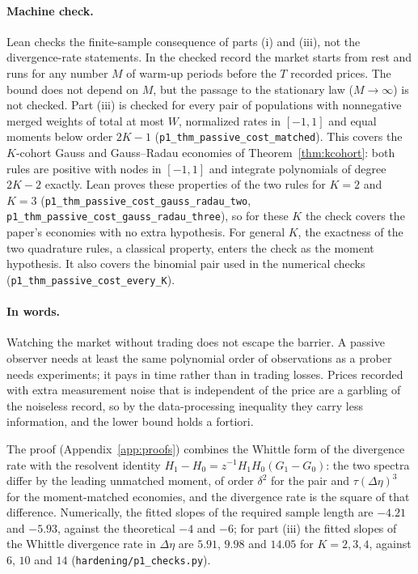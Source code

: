 \paragraph{Machine check.} Lean checks the finite-sample consequence of parts (i) and (iii), not the divergence-rate statements. In the checked record the market starts from rest and runs for any number $M$ of warm-up periods before the $T$ recorded prices. The bound does not depend on $M$, but the passage to the stationary law ($M\to\infty$) is not checked. Part (iii) is checked for every pair of populations with nonnegative merged weights of total at most $W$, normalized rates in $[-1,1]$ and equal moments below order $2K-1$ (\texttt{p1\_thm\_passive\_cost\_matched}). This covers the $K$-cohort Gauss and Gauss--Radau economies of Theorem~\ref{thm:kcohort}: both rules are positive with nodes in $[-1,1]$ and integrate polynomials of degree $2K-2$ exactly. Lean proves these properties of the two rules for $K=2$ and $K=3$ (\texttt{p1\_thm\_passive\_cost\_gauss\_radau\_two}, \texttt{p1\_thm\_passive\_cost\_gauss\_radau\_three}), so for these $K$ the check covers the paper's economies with no extra hypothesis. For general $K$, the exactness of the two quadrature rules, a classical property, enters the check as the moment hypothesis. It also covers the binomial pair used in the numerical checks (\texttt{p1\_thm\_passive\_cost\_every\_K}).

\paragraph{In words.} Watching the market without trading does not escape the barrier. A passive observer needs at least the same polynomial order of observations as a prober needs experiments; it pays in time rather than in trading losses. Prices recorded with extra measurement noise that is independent of the price are a garbling of the noiseless record, so by the data-processing inequality they carry less information, and the lower bound holds a fortiori.


The proof (Appendix~\ref{app:proofs}) combines the Whittle form of the divergence rate with the resolvent identity $H_1-H_0=z^{-1}H_1H_0(G_1-G_0)$: the two spectra differ by the leading unmatched moment, of order $\delta^2$ for the pair and $\tau(\Delta\eta)^3$ for the moment-matched economies, and the divergence rate is the square of that difference. Numerically, the fitted slopes of the required sample length are $-4.21$ and $-5.93$, against the theoretical $-4$ and $-6$; for part (iii) the fitted slopes of the Whittle divergence rate in $\Delta\eta$ are $5.91$, $9.98$ and $14.05$ for $K=2,3,4$, against $6$, $10$ and $14$ (\texttt{hardening/p1\_checks.py}).


